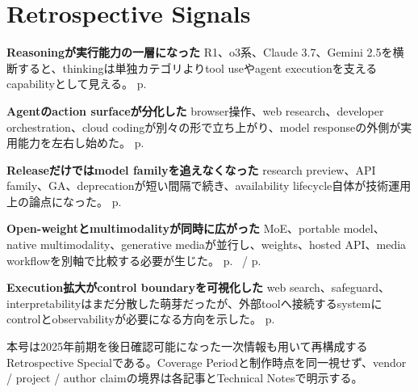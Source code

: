 \section*{Retrospective Signals}
\smallskip
\noindent\textbf{Reasoningが実行能力の一層になった} R1、o3系、Claude 3.7、Gemini 2.5を横断すると、thinkingは単独カテゴリよりtool useやagent executionを支えるcapabilityとして見える。 \hfill{\footnotesize p.~\pageref{pkg:reasoning}}\par
\smallskip
\noindent\textbf{Agentのaction surfaceが分化した} browser操作、web research、developer orchestration、cloud codingが別々の形で立ち上がり、model responseの外側が実用能力を左右し始めた。 \hfill{\footnotesize p.~\pageref{pkg:agents}}\par
\smallskip
\noindent\textbf{Releaseだけではmodel familyを追えなくなった} research preview、API family、GA、deprecationが短い間隔で続き、availability lifecycle自体が技術運用上の論点になった。 \hfill{\footnotesize p.~\pageref{pkg:lifecycle}}\par
\smallskip
\noindent\textbf{Open-weightとmultimodalityが同時に広がった} MoE、portable model、native multimodality、generative mediaが並行し、weights、hosted API、media workflowを別軸で比較する必要が生じた。 \hfill{\footnotesize p.~\pageref{pkg:open} / p.~\pageref{pkg:multimodal}}\par
\smallskip
\noindent\textbf{Execution拡大がcontrol boundaryを可視化した} web search、safeguard、interpretabilityはまだ分散した萌芽だったが、外部toolへ接続するsystemにcontrolとobservabilityが必要になる方向を示した。 \hfill{\footnotesize p.~\pageref{pkg:control}}\par
\medskip
\begin{claimboundary}
本号は2025年前期を後日確認可能になった一次情報も用いて再構成するRetrospective Specialである。Coverage Periodと制作時点を同一視せず、vendor / project / author claimの境界は各記事とTechnical Notesで明示する。
\end{claimboundary}
\medskip
\tableofcontents
